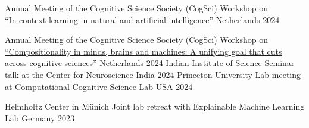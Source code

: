 



\begin{cvhonors}


    \cvhonor
    {Annual Meeting of the Cognitive Science Society (CogSci)} %
    {Workshop on \href{https://jacquespesnot.github.io/2024_CogSci_Workshop/}{“In‑context learning in natural and artificial intelligence”}} 
    {Netherlands} %
    {2024} %

    \cvhonor
    {Annual Meeting of the Cognitive Science Society (CogSci)} %
    {Workshop on  \href{https://workshop-compositionality-cogsci-2024.info/}{“Compositionality in minds, brains and machines: A unifying goal that cuts across cognitive sciences”}} 
    {Netherlands} %
    {2024} %
    \cvhonor
    {Indian Institute of Science} %
    {Seminar talk at the Center for Neuroscience} 
    {India} %
    {2024} %
    \cvhonor
    {Princeton University} %
    {Lab meeting at Computational Cognitive Science Lab} 
    {USA} %
    {2024} %

    \cvhonor
    {Helmholtz Center in Münich} %
    {Joint lab retreat with Explainable Machine Learning Lab} 
    {Germany} %
    {2023} %
    

\end{cvhonors}
